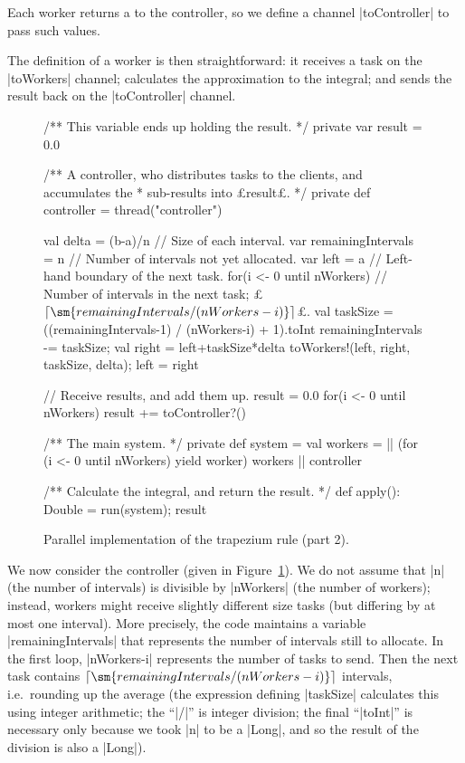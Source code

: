 Each worker returns a  to the controller, so we define a channel
|toController| to pass such values.

The definition of a worker is then straightforward: it receives a task on the
|toWorkers| channel; calculates the approximation to the integral; and sends
the result back on the |toController| channel.


\begin{figure}
\begin{scala}
  /** This variable ends up holding the result. */
  private var result = 0.0

  /** A controller, who distributes tasks to the clients, and accumulates the
    * sub-results into £result£. */
  private def controller = thread("controller"){
    val delta = (b-a)/n    // Size of each interval.
    var remainingIntervals = n    // Number of intervals not yet allocated.
    var left = a // Left-hand boundary of the next task.
    for(i <- 0 until nWorkers){
      // Number of intervals in the next task; £$\lceil \sm{remainingIntervals/(nWorkers-i)} \rceil$£.
      val taskSize = ((remainingIntervals-1) / (nWorkers-i) + 1).toInt
      remainingIntervals -= taskSize; val right = left+taskSize*delta
      toWorkers!(left, right, taskSize, delta); left = right
    }

    // Receive results, and add them up.
    result = 0.0
    for(i <- 0 until nWorkers) result += toController?()
  }    
    
  /** The main system. */
  private def system = {
    val workers = || (for (i <- 0 until nWorkers) yield worker)
    workers || controller
  }

  /** Calculate the integral, and return the result. */
  def apply(): Double = { run(system); result } 
\end{scala}
\caption{Parallel implementation of the trapezium rule (part 2).}
\label{fig:trapezium-2}
\end{figure}


We now consider the controller (given in Figure~\ref{fig:trapezium-2}).  We do
not assume that |n| (the number of intervals) is divisible by |nWorkers| (the
number of workers); instead, workers might receive slightly different size
tasks (but differing by at most one interval).  More precisely, the code
maintains a variable |remainingIntervals| that represents the number of
intervals still to allocate.  In the first loop, |nWorkers-i| represents the
number of tasks to send.  Then the next task contains $\lceil
\sm{remainingIntervals/(nWorkers-i)} \rceil$ intervals, i.e.~rounding up the
average (the expression defining |taskSize| calculates this using integer
arithmetic; the ``|/|'' is integer division; the final ``|toInt|'' is
necessary only because we took |n| to be a |Long|, and so the result of the
division is also a |Long|).


